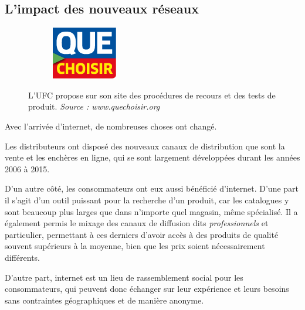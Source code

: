\subsection{L'impact des nouveaux réseaux}

\begin{figure}
~~~~~~\includegraphics[scale=1]{Rsc/logo-quechoisir.png} 
\caption{L'UFC propose sur son site des procédures de recours et des tests de produit. \textit{Source : www.quechoisir.org}}
\label{UFC}
\end{figure} 

Avec l'arrivée d'internet, de nombreuses choses ont changé.

\medbreak
Les distributeurs ont disposé des nouveaux canaux de distribution que sont la vente et les enchères en ligne, qui se sont largement développées durant les années 2006 à 2015.

\bigbreak
D'un autre côté, les consommateurs ont eux aussi bénéficié d'internet.\smallbreak
D'une part il s'agit d'un outil puissant pour la recherche d'un produit, car les catalogues y sont beaucoup plus larges que dans n'importe quel magasin, même spécialisé. Il a également permis le mixage des canaux de diffusion dits \textit{professionnels} et {particulier}, permettant à ces derniers d'avoir accès à des produits de qualité souvent supérieurs à la moyenne, bien que les prix soient nécessairement différents.

D'autre part, internet est un lieu de rassemblement social pour les consommateurs, qui peuvent donc échanger sur leur expérience et leurs besoins sans contraintes géographiques et de manière anonyme.